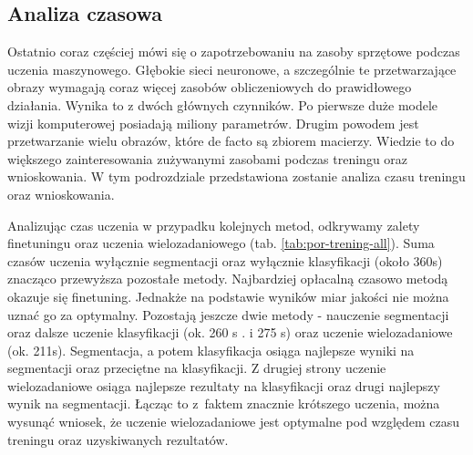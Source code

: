 \subsection{Analiza czasowa}
Ostatnio coraz częściej mówi się o zapotrzebowaniu na zasoby sprzętowe podczas uczenia maszynowego. Głębokie sieci neuronowe, a szczególnie te przetwarzające obrazy wymagają coraz więcej zasobów obliczeniowych do prawidłowego działania. Wynika to z dwóch głównych czynników. Po pierwsze duże modele wizji komputerowej posiadają miliony parametrów. Drugim powodem jest przetwarzanie wielu obrazów, które de facto są zbiorem macierzy. Wiedzie to do większego zainteresowania zużywanymi zasobami podczas treningu oraz wnioskowania. W tym podrozdziale przedstawiona zostanie analiza czasu treningu oraz wnioskowania.

Analizując czas uczenia w przypadku kolejnych metod, odkrywamy zalety finetuningu oraz uczenia wielozadaniowego (tab. \ref{tab:por-trening-all}). Suma czasów uczenia wyłącznie segmentacji oraz wyłącznie klasyfikacji (około 360s) znacząco przewyższa pozostałe metody. Najbardziej opłacalną czasowo metodą okazuje się finetuning. Jednakże na podstawie wyników miar jakości nie można uznać go za optymalny. Pozostają jeszcze dwie metody - nauczenie segmentacji oraz dalsze uczenie klasyfikacji (ok. 260 s . i 275 s) oraz uczenie wielozadaniowe (ok. 211s). Segmentacja, a potem klasyfikacja osiąga najlepsze wyniki na segmentacji oraz przeciętne na klasyfikacji. Z drugiej strony uczenie wielozadaniowe osiąga najlepsze rezultaty na klasyfikacji oraz drugi najlepszy wynik na segmentacji. Łącząc to z~faktem znacznie krótszego uczenia, można wysunąć wniosek, że uczenie wielozadaniowe jest optymalne pod względem czasu treningu oraz uzyskiwanych rezultatów.





